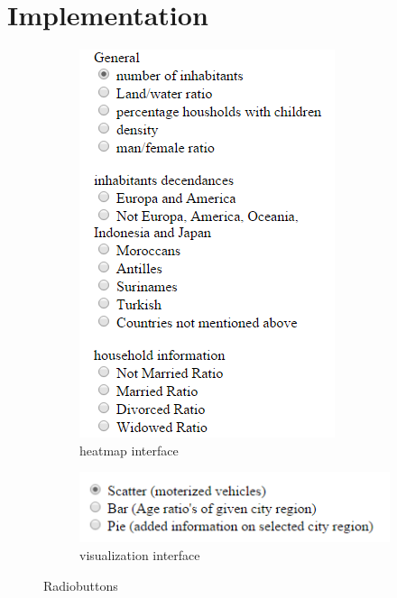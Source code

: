 \documentclass[a4paper,twoside,11pt]{article}
\begin{document}
\section{Implementation}
\begin{figure}
        \centering
        \begin{subfigure}[h]{0.3\textwidth}
                \includegraphics[width=\textwidth]{Interface/HeatmapInterface.png}
                \caption{heatmap interface}
        \end{subfigure}%
        \newline
        \begin{subfigure}[h]{0.34\textwidth}
                \includegraphics[width=\textwidth]{Interface/VisualizationInterface.png}
                \caption{visualization interface}
        \end{subfigure} \newline
        \caption{Radiobuttons}
\end{figure}
\end{document}
